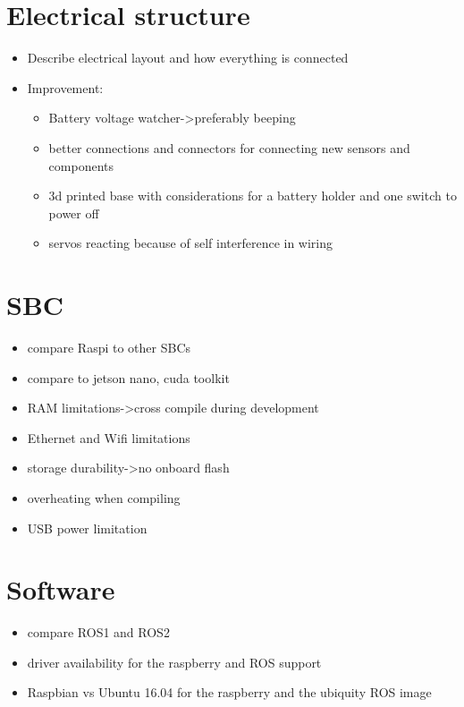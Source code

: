 \section{Electrical structure}\label{sec:elec_struct}
\begin{itemize}
\item Describe electrical layout and how everything is connected
\item Improvement:
 \begin{itemize}
  \item Battery voltage watcher->preferably beeping
  \item better connections and connectors for connecting new sensors and components
  \item 3d printed base with considerations for a battery holder and one switch to power off
  \item servos reacting because of self interference in wiring
 \end{itemize}
\end{itemize}

\section{SBC}\label{sec:sbc_lim}
\begin{itemize}
 \item compare Raspi to other SBCs
 \item compare to jetson nano, cuda toolkit
 \item RAM limitations->cross compile during development
 \item Ethernet and Wifi limitations
 \item storage durability->no onboard flash
 \item overheating when compiling
 \item USB power limitation
\end{itemize}

\section{Software}\label{software_lim}
\begin{itemize}
 \item compare ROS1 and ROS2
 \item driver availability for the raspberry and ROS support
 \item Raspbian vs Ubuntu 16.04 for the raspberry and the ubiquity ROS image
\end{itemize}

